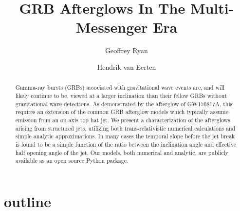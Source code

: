 \documentclass[twocolumn]{aastex62}
\begin{document}
\title{GRB Afterglows In The Multi-Messenger Era}

\author[0000-0001-9068-7157]{Geoffrey Ryan}

\author{Hendrik van Eerten}


\begin{abstract}
	Gamma-ray bursts (GRBs) associated with gravitational wave events are, and will likely continue to be, viewed at a larger inclination than their fellow GRBs without gravitational wave detections.  As demonstrated by the afterglow of GW170817A, this requires an extension of the common GRB afterglow models which typically assume emission from an on-axis top hat jet.  We present a characterization of the afterglows arising from structured jets, utilizing both trans-relativistic numerical calculations and simple analytic approximations.  In many cases the temporal slope before the jet break is found to be a simple function of the ratio between the inclination angle and effective half opening angle of the jet.  Our models, both numerical and analytic, are publicly available as an open source Python package.
	
\end{abstract}

\section{outline}
\end{document}
